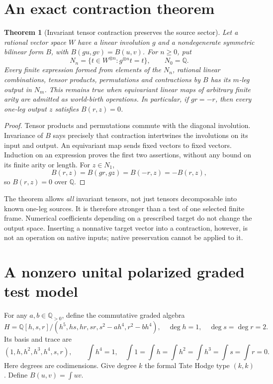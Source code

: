 \documentclass[11pt]{article}
\newcommand{\Q}{\mathbb Q}
\newtheorem{theorem}{Theorem}
\begin{document}
\section{An exact contraction theorem}
\begin{theorem}[Invariant tensor contraction preserves the source sector]
Let a rational vector space \(W\) have a linear involution \(g\) and
a nondegenerate symmetric bilinear form \(B\), with
\(B(gu,gv)=B(u,v)\). For \(n\geq0\), put
\[
 N_n=\{t\in W^{\otimes n}:g^{\otimes n}t=t\},\qquad N_0=\Q.
\]
Every finite expression formed from elements of the \(N_n\), rational
linear combinations, tensor products, permutations and contractions
by \(B\) has its \(m\)-leg output in \(N_m\).
This remains true when equivariant linear maps of arbitrary finite
arity are admitted as world-birth operations. In particular, if
\(gr=-r\), then every one-leg output \(z\) satisfies \(B(r,z)=0\).
\end{theorem}
\begin{proof}
Tensor products and permutations commute with the diagonal involution.
Invariance of \(B\) says precisely that contraction intertwines the
involutions on its input and output. An equivariant map sends fixed
vectors to fixed vectors. Induction on an expression proves the first
two assertions, without any bound on its finite arity or length.
For \(z\in N_1\),
\[
 B(r,z)=B(gr,gz)=B(-r,z)=-B(r,z),
\]
so \(B(r,z)=0\) over \(\Q\).
\end{proof}

The theorem allows \emph{all} invariant tensors, not just tensors
decomposable into known one-leg sources. It is therefore stronger than
a test of one selected finite frame. Numerical coefficients depending
on a prescribed target do not change the output space. Inserting a
nonnative target vector into a contraction, however, is not an
operation on native inputs; native preservation cannot be applied to it.

\section{A nonzero unital polarized graded test model}
For any \(a,b\in\Q_{>0}\), define the commutative graded algebra
\[
 H=\Q[h,s,r]/(h^5,hs,hr,sr,s^2-ah^4,r^2-bh^4),
 \quad \deg h=1,\quad\deg s=\deg r=2.                         \tag{2}
\]
Its basis and trace are
\[
 (1,h,h^2,h^3,h^4,s,r),\qquad
 \int h^4=1,\quad \int 1=\int h=\int h^2=\int h^3=\int s=\int r=0.
 \tag{3}
\]
Here degrees are codimensions. Give degree \(k\) the formal Tate
Hodge type \((k,k)\). Define \(B(u,v)=\int uv\).
\end{document}
